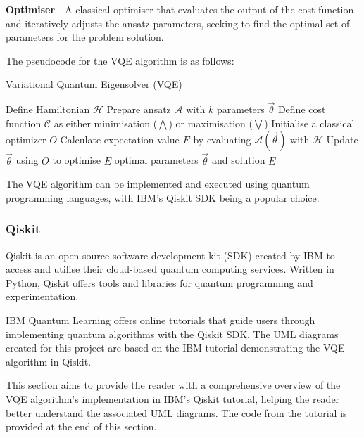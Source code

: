 \documentclass{article}
\newcounter{subsubsubsection}[subsubsection]
\begin{document}
{\textbf{Optimiser} - A classical optimiser that evaluates the output of the cost function and iteratively adjusts the ansatz parameters, seeking to find the optimal set of parameters for the problem solution\cite{Tutorial}\cite{vqeqiskit}. 

The pseudocode for the VQE algorithm is as follows:

\begin{algorithm}[H]
\caption{Variational Quantum Eigensolver (VQE)}\label{vqe_algorithm}
\begin{algorithmic}[1]
\State Define Hamiltonian \( \mathcal{H} \)
\State Prepare ansatz \( \mathcal{A} \) with \( k \) parameters \( \overrightarrow{\theta} \)
\State Define cost function $\mathcal{C}$ as either minimisation ($\bigwedge$) or maximisation ($\bigvee$)
\State Initialise a classical optimizer \( O \)
    \State Calculate expectation value \( E \) by evaluating \( \mathcal{A}(\overrightarrow{\theta}) \) with \( \mathcal{H} \)
    \State Update \( \overrightarrow{\theta} \) using \( O \) to optimise \( E \)
\EndWhile
\State \Return optimal parameters \( \overrightarrow{\theta} \) and solution \( E \)
\end{algorithmic}
\end{algorithm}

The VQE algorithm can be implemented and executed using quantum programming languages, with IBM’s Qiskit SDK being a popular choice.

\subsubsection{Qiskit}

Qiskit is an open-source software development kit (SDK) created by IBM to access and utilise their cloud-based quantum computing services. Written in Python, Qiskit offers tools and libraries for quantum programming and experimentation. 

IBM Quantum Learning offers online tutorials\cite{Tutorial} that guide users through implementing quantum algorithms with the Qiskit SDK. The UML diagrams created for this project are based on the IBM tutorial demonstrating the VQE algorithm in Qiskit\cite{IBM2024}.


This section aims to provide the reader with a comprehensive overview of the VQE algorithm's implementation in IBM's Qiskit tutorial, helping the reader better understand the associated UML diagrams. The code from the tutorial is provided at the end of this section.

}
\end{document}
